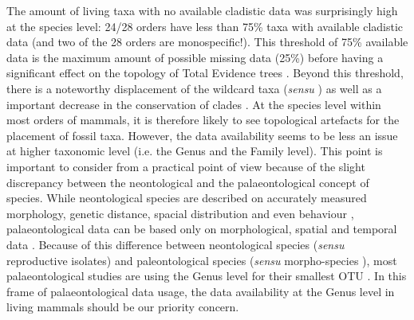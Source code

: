 \documentclass[12pt,letterpaper]{article}
\renewcommand{\subsection}[1]{%
\bigskip
\begin{center}
\begin{large}
\normalfont\itshape #1
\end{large}
\end{center}}
\begin{document}
The amount of living taxa with no available cladistic data was surprisingly high at the species level: 24/28 orders have less than 75\% taxa with available cladistic data (and two of the 28 orders are monospecific!).
This threshold of 75\% available data is the maximum amount of possible missing data (25\%) before having a significant effect on the topology of Total Evidence trees \citep{GuillermeCooper}.
Beyond this threshold, there is a noteworthy displacement of the wildcard taxa (\textit{sensu} \citep{kearneyfragmentary2002}) as well as a important decrease in the conservation of clades \citep{GuillermeCooper}.
At the species level within most orders of mammals, it is therefore likely to see topological artefacts for the placement of fossil taxa.
However, the data availability seems to be less an issue at higher taxonomic level (i.e. the Genus and the Family level).
This point is important to consider from a practical point of view because of the slight discrepancy between the neontological and the palaeontological concept of species.
While neontological species are described on accurately measured morphology, genetic distance, spacial distribution and even behaviour \citep[e.g.][]{kellymolecular2014}, palaeontological data can be based only on morphological, spatial and temporal data \citep[e.g.][]{ni2013oldest}.
Because of this difference between neontological species (\textit{sensu} reproductive isolates) and paleontological species (\textit{sensu} morpho-species %
), most palaeontological studies are using the Genus level for their smallest OTU \citep[e.g.][]{ni2013oldest,O'Leary08022013}.
In this frame of palaeontological data usage, the data availability at the Genus level in living mammals should be our priority concern.
\end{document}
